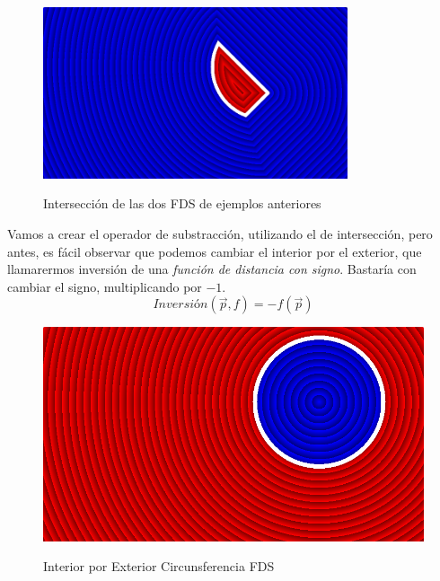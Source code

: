 \begin{figure}[H]
  \centering
  \captionsetup{justification=centering}%
  \includegraphics[width=0.8\textwidth]{secciones/imagenes/sdf/2d/sdf_subtract-1.png}\label{fig:disyunccion}
  \caption{Intersección de las dos FDS de ejemplos anteriores}
\end{figure}

Vamos a crear el operador de substracción, utilizando el de intersección, pero antes, es fácil observar que podemos cambiar el interior por el exterior, que llamarermos inversión de una \textit{función de distancia con signo}. Bastaría con cambiar el signo, multiplicando por \(-1\).
\[ Inversión(\Vec{p}, f) = -f(\Vec{p}) \]

\begin{figure}[H]
  \centering
  \captionsetup{justification=centering}%
  \includegraphics[width=1.0\textwidth]{secciones/imagenes/sdf/2d/sdf_subtract-2.png}\label{fig:negative}
  \caption{ Interior por Exterior Circunsferencia FDS}
\end{figure}

